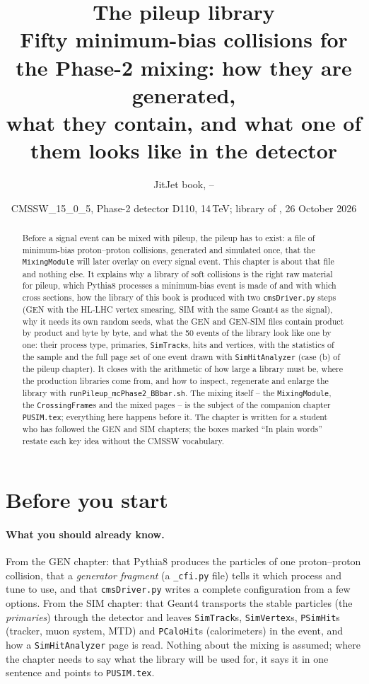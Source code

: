 \documentclass[11pt,a4paper]{article}
\title{\textbf{The pileup library}\\[4pt]
  \large Fifty minimum-bias collisions for the Phase-2 mixing: how they are generated,\\
  what they contain, and what one of them looks like in the detector}
\author{JitJet book, \code{JitJetSW/Journey} -- \code{doc/pu/PULib.tex}}
\date{CMSSW\_15\_0\_5, Phase-2 detector D110, 14\,TeV; library of \code{test/PU\_Phase2/}, 26 October 2026}
\newcommand{\code}[1]{\texttt{#1}}
\begin{document}
\maketitle

\begin{abstract}
\noindent
Before a signal event can be mixed with pileup, the pileup has to exist: a file of minimum-bias
proton--proton collisions, generated and simulated once, that the \code{MixingModule} will later overlay on
every signal event. This chapter is about that file and nothing else. It explains why a library of soft
collisions is the right raw material for pileup, which Pythia8 processes a minimum-bias event is made of and
with which cross sections, how the library of this book is produced with two \code{cmsDriver.py} steps (GEN
with the HL-LHC vertex smearing, SIM with the same Geant4 as the signal), why it needs its own random seeds,
what the GEN and GEN-SIM files contain product by product and byte by byte, and what the 50 events of the
library look like one by one: their process type, primaries, \code{SimTrack}s, hits and vertices, with the
statistics of the sample and the full page set of one event drawn with \code{SimHitAnalyzer} (case (b) of
the pileup chapter). It closes with the arithmetic of how large a library must be, where the production
libraries come from, and how to inspect, regenerate and enlarge the library with
\code{runPileup\_mcPhase2\_BBbar.sh}. The mixing itself -- the \code{MixingModule}, the \code{CrossingFrame}s
and the mixed pages -- is the subject of the companion chapter \code{PUSIM.tex}; everything here happens
before it. The chapter is written for a student who has followed the GEN and SIM chapters; the boxes marked
``In plain words'' restate each key idea without the CMSSW vocabulary.
\end{abstract}
\clearpage
\tableofcontents
\clearpage

\section{Before you start}
\label{sec:before}

\paragraph{What you should already know.} From the GEN chapter: that Pythia8 produces the particles of one
proton--proton collision, that a \emph{generator fragment} (a \code{\_cfi.py} file) tells it which process and
tune to use, and that \code{cmsDriver.py} writes a complete configuration from a few options. From the SIM
chapter: that Geant4 transports the stable particles (the \emph{primaries}) through the detector and leaves
\code{SimTrack}s, \code{SimVertex}s, \code{PSimHit}s (tracker, muon system, MTD) and \code{PCaloHit}s
(calorimeters) in the event, and how a \code{SimHitAnalyzer} page is read. Nothing about the mixing is
assumed; where the chapter needs to say what the library will be used for, it says it in one sentence and
points to \code{PUSIM.tex}.
\end{document}
